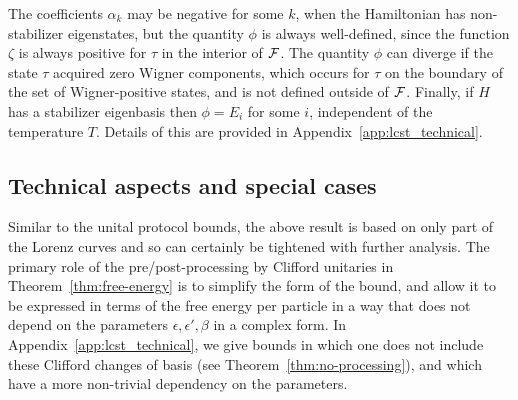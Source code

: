 \documentclass[pra,
aps,
twocolumn,
superscriptaddress,
groupedaddress,
nofootinbib,
reprint
]{revtex4-1}
\begin{document}
The coefficients $\alpha_k$ may be negative for some $k$, when the Hamiltonian has non-stabilizer eigenstates, but the quantity $\phi$ is always well-defined, since the function $\zeta$ is always positive for $\tau$ in the interior of ${\mathcal F}$. The quantity $\phi$ can diverge if the state $\tau$ acquired zero Wigner components, which occurs for $\tau$ on the boundary of the set of Wigner-positive states, and is not defined outside of ${\mathcal F}$. Finally, if $H$ has a stabilizer eigenbasis then $\phi = E_i$ for some $i$, independent of the temperature $T$. Details of this are provided in Appendix~\ref{app:lcst_technical}.

\subsection{Technical aspects and special cases}
Similar to the unital protocol bounds, the above result is based on only part of the Lorenz curves and so can certainly be tightened with further analysis. The primary role of the pre/post-processing by Clifford unitaries in Theorem~\ref{thm:free-energy} is to simplify the form of the bound, and allow it to be expressed in terms of the free energy per particle in a way that does not depend on the parameters $\epsilon, \epsilon', \beta$ in a complex form. In Appendix~\ref{app:lcst_technical}, we give bounds in which one does not include these Clifford changes of basis (see Theorem~\ref{thm:no-processing}), and which have a more non-trivial dependency on the parameters.
\end{document}
